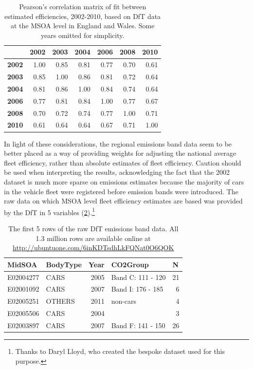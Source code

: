 \documentclass[a4paper, 11pt, twoside]{Thesis}
\begin{document}
\begin{table}[htbp]
\caption[Correlation matrix of estimated fleet efficiencies, 2002-2010]
{Pearson's correlation matrix of fit between estimated efficiencies,
2002-2010, based on DfT data at the MSOA level in England and Wales. Some years
omitted for simplicity.}
\begin{center}
\begin{tabular}{rrrrrrr}
\toprule
& \textbf{2002} & \textbf{2003} & \textbf{2004} &
\textbf{2006} & \textbf{2008} & \textbf{2010} \\
\midrule
\textbf{2002} & 1.00 & 0.85 & 0.81 & 0.77 & 0.70 & 0.61 \\
\textbf{2003} & 0.85 & 1.00 & 0.86 & 0.81 & 0.72 & 0.64 \\
\textbf{2004} & 0.81 & 0.86 & 1.00 & 0.84 & 0.74 & 0.64 \\
\textbf{2006} & 0.77 & 0.81 & 0.84 & 1.00 & 0.77 & 0.67 \\
\textbf{2008} & 0.70 & 0.72 & 0.74 & 0.77 & 1.00 & 0.71 \\
\textbf{2010} & 0.61 & 0.64 & 0.64 & 0.67 & 0.71 & 1.00 \\ \bottomrule
\end{tabular}  \end{center}
\label{tfleetscat}
\end{table}

In light of these considerations, the regional emissions band data seem to be
better placed as a way of providing weights for adjusting the
national average fleet efficiency, rather than absolute estimates of
fleet efficiency. Caution should be used when interpreting the results,
acknowledging the fact that the 2002 dataset is much more sparse on
emissions estimates because the majority of cars in the vehicle fleet
were registered before emission bands were introduced.
The raw
data on which MSOA level fleet efficiency estimates are based was provided by
the DfT in 5 variables (\cref{tefraw}).\footnote{Thanks to Daryl Lloyd,
who created the bespoke dataset
used for this purpose.
}

\begin{table}[htbp]
\caption[The first 5 rows of the raw DfT emissions band data]
{The first 5 rows of the raw DfT emissions band data. All 1.3 million
rows are available online at \href{http://ubuntuone.com/6inKDTsdhLkFQNat0O6QOK}
{http://ubuntuone.com/6inKDTsdhLkFQNat0O6QOK}}
\begin{center}
\begin{tabular}{llrlr}
\toprule
MidSOA & BodyType & \multicolumn{1}{l}{Year} & CO2Group & \multicolumn{1}{l}{N} \\
\midrule
E02004277 & CARS & 2005 & Band C: 111 - 120 & 21 \\
E02001092 & CARS & 2007 & Band I: 176 - 185 & 6 \\
E02005251 & OTHERS & 2011 & non-cars & 4 \\
E02005506 & CARS & 2004 &  & 3 \\
E02003897 & CARS & 2007 & Band F: 141 - 150 & 26 \\
\bottomrule
\end{tabular} \end{center}
\label{tefraw}
\end{table}
\end{document}
